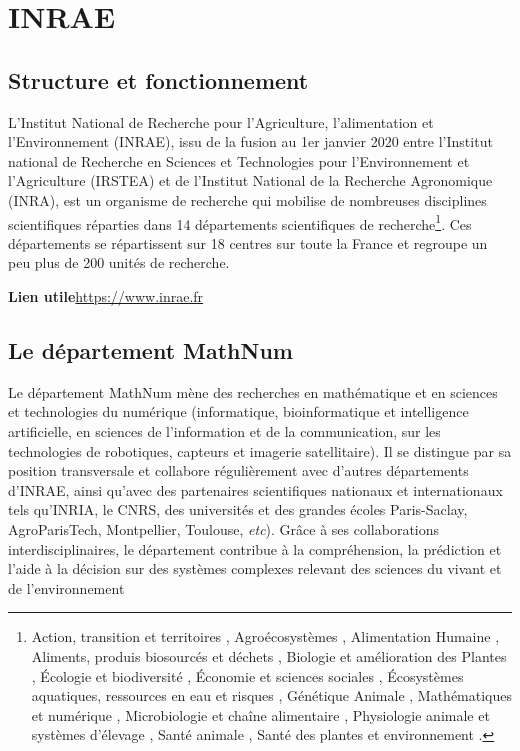  
 
 \chapter{INRAE}
 
 \section{Structure et fonctionnement}
 
L'Institut National de Recherche pour l'Agriculture, l'alimentation et l'Environnement (INRAE), issu de la fusion au 1er janvier 2020 entre l'Institut national de Recherche en Sciences et Technologies pour l'Environnement et l'Agriculture (IRSTEA) et de l’Institut National de la Recherche Agronomique (INRA), est un organisme de recherche qui mobilise de nombreuses disciplines scientifiques r\'eparties dans 14 d\'epartements scientifiques de recherche\footnote{
\og Action, transition et territoires \fg{},
\og  Agro\'ecosyst\`emes \fg{},
\og  Alimentation Humaine \fg{},
\og  Aliments, produis biosourc\'es et d\'echets \fg{},
\og  Biologie et am\'elioration des Plantes \fg{},
\og  \'Ecologie et biodiversit\'e \fg{},
\og  \'Economie et sciences sociales \fg{},
\og  \'Ecosyst\`emes aquatiques, ressources en eau et risques \fg{},
\og  G\'en\'etique Animale \fg{},
\og  Math\'ematiques et num\'erique \fg{},
\og  Microbiologie et cha\^ine alimentaire \fg{},
\og  Physiologie animale et syst\`emes d'\'elevage \fg{},
\og  Sant\'e animale \fg{},
\og  Sant\'e des plantes et environnement \fg{}.}.
Ces d\'epartements se r\'epartissent sur 18 centres sur toute la France et regroupe un peu plus de 200 unit\'es de recherche.

\textbf{Lien utile\hspace{.5em}}\url{https://www.inrae.fr}

\section{Le d\'epartement MathNum} 

Le d\'epartement MathNum m\`ene des recherches en math\'ematique et en sciences et technologies du num\'erique (informatique, bioinformatique et intelligence artificielle, en sciences de l'information et de la communication, sur les technologies de robotiques, capteurs et imagerie satellitaire). Il se distingue par sa position transversale et collabore r\'eguli\`erement avec d'autres d\'epartements d'INRAE, ainsi qu'avec des partenaires scientifiques nationaux et internationaux tels qu'INRIA, le CNRS, des universit\'es et des grandes \'ecoles Paris-Saclay, AgroParisTech, Montpellier, Toulouse,  {\em etc}). Grâce \`a ses collaborations interdisciplinaires, le d\'epartement contribue \`a la compr\'ehension, la pr\'ediction et l'aide \`a la d\'ecision sur des syst\`emes complexes relevant des sciences du vivant et de l'environnement

